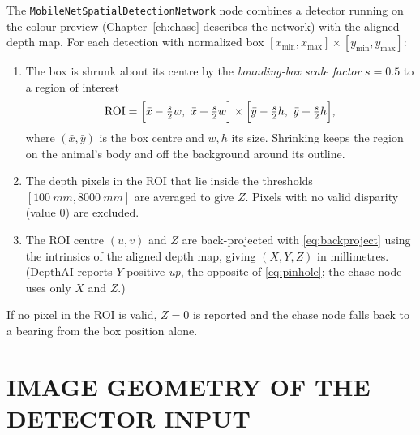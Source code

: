 The \texttt{MobileNetSpatialDetectionNetwork} node combines a detector
running on the colour preview (Chapter~\ref{ch:chase} describes the
network) with the aligned depth map. For each detection with normalized box
$[x_{\min},x_{\max}]\times[y_{\min},y_{\max}]$:
\begin{enumerate}
\item The box is shrunk about its centre by the \emph{bounding-box scale
  factor} $s=0.5$ to a region of interest
  \begin{equation}
  \mathrm{ROI}=\Bigl[\bar x-\tfrac{s}{2}w,\ \bar x+\tfrac{s}{2}w\Bigr]\times
               \Bigl[\bar y-\tfrac{s}{2}h,\ \bar y+\tfrac{s}{2}h\Bigr],
  \end{equation}
  where $(\bar x,\bar y)$ is the box centre and $w,h$ its size. Shrinking
  keeps the region on the animal's body and off the background around its
  outline.
\item The depth pixels in the ROI that lie inside the thresholds
  $[\SI{100}{mm},\SI{8000}{mm}]$ are averaged to give $Z$. Pixels with no
  valid disparity (value 0) are excluded.
\item The ROI centre $(u,v)$ and $Z$ are back-projected with
  \eqref{eq:backproject} using the intrinsics of the aligned depth map,
  giving $(X,Y,Z)$ in millimetres. (DepthAI reports $Y$ positive
  \emph{up}, the opposite of \eqref{eq:pinhole}; the chase node uses only
  $X$ and $Z$.)
\end{enumerate}
If no pixel in the ROI is valid, $Z=0$ is reported and the chase node falls
back to a bearing from the box position alone.

\section{IMAGE GEOMETRY OF THE DETECTOR INPUT}
\label{sec:previewcrop}

